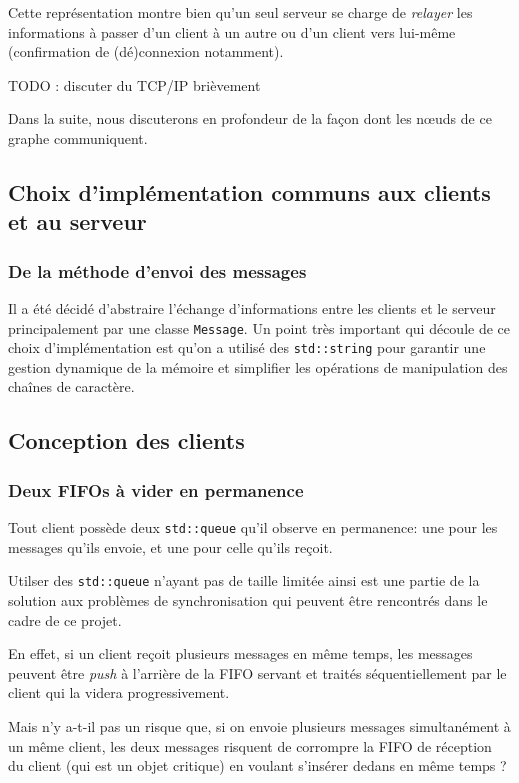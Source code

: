 \documentclass{article}
\begin{document}
Cette représentation montre bien qu'un seul serveur se charge de \textit{relayer} les informations à passer d'un client à un autre ou d'un client vers lui-même (confirmation de (dé)connexion notamment). 

TODO : discuter du TCP/IP brièvement

Dans la suite, nous discuterons en profondeur de la façon dont les nœuds de ce graphe communiquent.

\subsection{Choix d'implémentation communs aux clients et au serveur}

\subsubsection{De la méthode d'envoi des messages}
Il a été décidé d'abstraire l'échange d'informations entre les clients et le serveur principalement par une classe \texttt{Message}. Un point très important qui découle de ce choix d'implémentation est qu'on a utilisé des \texttt{std::string} pour garantir une gestion dynamique de la mémoire et simplifier les opérations de manipulation des chaînes de caractère.

\subsection{Conception des clients}

\subsubsection{Deux FIFOs à vider en permanence}
Tout client possède deux \texttt{std::queue} qu'il observe en permanence: une pour les messages qu'ils envoie, et une pour celle qu'ils reçoit. 

Utilser des \texttt{std::queue} n'ayant pas de taille limitée ainsi est une partie de la solution aux problèmes de synchronisation qui peuvent être rencontrés dans le cadre de ce projet. 

En effet, si un client reçoit plusieurs messages en même temps, les messages peuvent être \textit{push} à l'arrière de la FIFO servant et traités séquentiellement par le client qui la videra progressivement.


 Mais n'y a-t-il pas un risque que, si on envoie plusieurs messages simultanément à un même client, les deux messages risquent de corrompre la FIFO de réception du client (qui est un objet critique) en voulant s'insérer dedans en même temps ?
\end{document}
